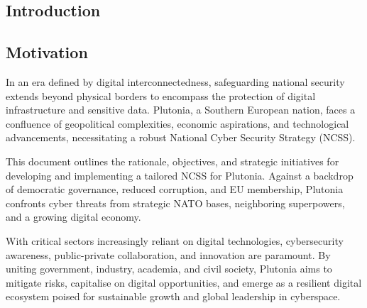 \documentclass[
	a4paper, %
	12pt, %
]{CSSullivanBusinessReport}
\begin{document}
\begin{fullwidth}
\tableofcontents
\newpage

\begin{justify}

\section{Introduction}
\subsection{Motivation }
In an era defined by digital interconnectedness, safeguarding national security extends beyond physical borders to encompass the protection of digital infrastructure and sensitive data. Plutonia, a Southern European nation, faces a confluence of geopolitical complexities, economic aspirations, and technological advancements, necessitating a robust National Cyber Security Strategy (NCSS).

This document outlines the rationale, objectives, and strategic initiatives for developing and implementing a tailored NCSS for Plutonia. Against a backdrop of democratic governance, reduced corruption, and EU membership, Plutonia confronts cyber threats from strategic NATO bases, neighboring superpowers, and a growing digital economy.

With critical sectors increasingly reliant on digital technologies, cybersecurity awareness, public-private collaboration, and innovation are paramount. By uniting government, industry, academia, and civil society, Plutonia aims to mitigate risks, capitalise on digital opportunities, and emerge as a resilient digital ecosystem poised for sustainable growth and global leadership in cyberspace.


\end{justify}
\end{fullwidth}
\end{document}
